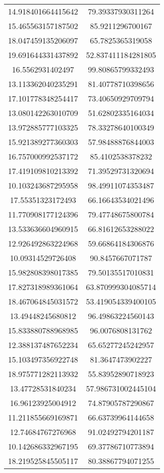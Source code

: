 \begin{table}
\begin{tabular}{cc}
14.918401664415642 & 79.39337930311264 \\
15.465563157187502 & 85.9211296700167 \\
18.047459135206097 & 65.7825365319058 \\
19.691644331437892 & 52.837411184281805 \\
16.5562931402497 & 99.80865799332493 \\
13.113362040235291 & 81.40778710398656 \\
17.101778348254417 & 73.40650929709794 \\
13.080142263010709 & 51.62802335164034 \\
13.972885777103325 & 78.33278640100349 \\
15.921389277360303 & 57.98488876844003 \\
16.757000992537172 & 85.4102538378232 \\
17.419109810213392 & 71.39529731320694 \\
10.103243687295958 & 98.49911074353487 \\
17.55351323172493 & 66.16643534021496 \\
11.770908177124396 & 79.47748675800784 \\
13.533636604960915 & 66.81612653288022 \\
12.926492863224968 & 59.66864184306876 \\
10.09314529726408 & 90.8457667071787 \\
15.982808398017385 & 79.50135517010831 \\
17.827318989361064 & 63.870999304085714 \\
18.467064845031572 & 53.419054339400105 \\
13.49448245680812 & 96.49863224560143 \\
15.833880788968985 & 96.0076808131762 \\
12.388137487652234 & 65.65277245242957 \\
15.103497356922748 & 81.3647473902227 \\
18.975771282113932 & 55.83952890718923 \\
13.47728531840234 & 57.986731002445104 \\
16.96123925004912 & 74.87905787290867 \\
11.211855669169871 & 66.63739964144658 \\
12.74684767276968 & 91.02492794201187 \\
10.142686332967195 & 69.37786710773894 \\
18.219525845505117 & 80.38867794071255 \\

\end{tabular}
\end{table}
